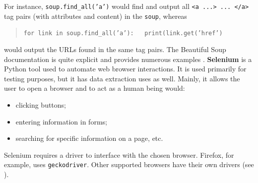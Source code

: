 \par For instance, \texttt{soup.find\_all('a')} would find and output all \texttt{<a ...> ... </a>} tag pairs (with attributes and content) in the \texttt{soup}, whereas \begin{quote}\texttt{for link in soup.find\_all('a'):}\newline \texttt{\ \ \ print(link.get('href')}
\end{quote} would output the URLs found in the same tag pairs. The Beautiful Soup documentation is quite explicit and provides numerous examples \cite{DC_BS}. 
\newl\textbf{Selenium} is a Python tool used to automate web browser interactions.  It is used primarily for testing purposes, but it has data extraction uses as well. Mainly, it allows the user to open a browser and to act as a human being would:
\begin{itemize}[noitemsep]
    \item clicking buttons;
\item entering information in forms;
\item searching for specific information on a page, etc.
\end{itemize}
Selenium requires a driver to interface with the chosen browser. Firefox, for example, uses \texttt{geckodriver}. Other supported browsers have their own drivers (see \cite{DC_S_C,DC_S_E,DC_S_F,DC_S_S}).

